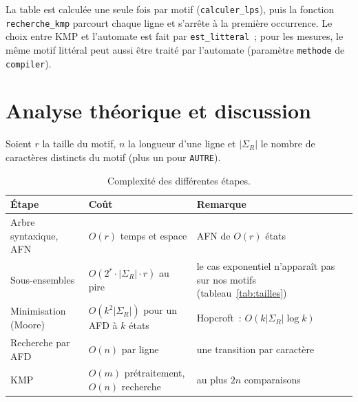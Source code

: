 \documentclass[11pt,a4paper]{article}
\begin{document}
La table est calculée une seule fois par motif (\texttt{calculer\_lps}), puis
la fonction \texttt{recherche\_kmp} parcourt chaque ligne et s'arrête à la
première occurrence. Le choix entre KMP et l'automate est fait par
\texttt{est\_litteral}~; pour les mesures, le même motif littéral peut aussi
être traité par l'automate (paramètre \texttt{methode} de \texttt{compiler}).

\section{Analyse théorique et discussion}
\label{sec:analyse}

Soient $r$ la taille du motif, $n$ la longueur d'une ligne et $|\Sigma_R|$ le
nombre de caractères distincts du motif (plus un pour \texttt{AUTRE}).

\begin{table}[ht]
\centering
\begin{tabularx}{\textwidth}{lXX}
\toprule
\textbf{Étape} & \textbf{Coût} & \textbf{Remarque} \\
\midrule
Arbre syntaxique, AFN & $O(r)$ temps et espace & AFN de $O(r)$ états \\
Sous-ensembles & $O(2^{r}\cdot|\Sigma_R|\cdot r)$ au pire & le cas exponentiel n'apparaît pas sur nos motifs (tableau~\ref{tab:tailles}) \\
Minimisation (Moore) & $O(k^2|\Sigma_R|)$ pour un AFD à $k$ états & Hopcroft~: $O(k|\Sigma_R|\log k)$ \\
Recherche par AFD & $O(n)$ par ligne & une transition par caractère \\
KMP & $O(m)$ prétraitement, $O(n)$ recherche & au plus $2n$ comparaisons \\
\bottomrule
\end{tabularx}
\caption{Complexité des différentes étapes.}
\label{tab:complexite}
\end{table}
\end{document}
